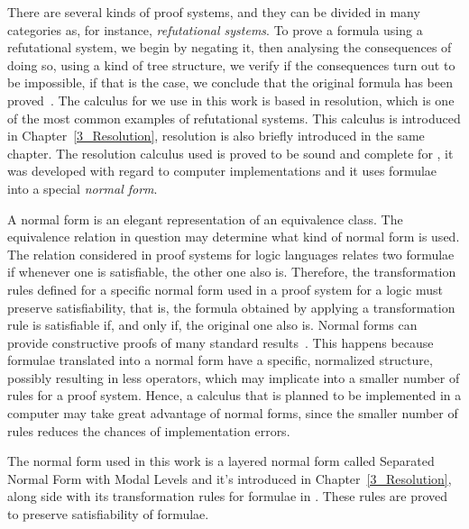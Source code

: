 There are several kinds of proof systems, and they can be divided in many
categories as, for instance, \emph{refutational systems}. To prove a formula
using a refutational system, we begin by negating it, then analysing the
consequences of doing so, using a kind of tree structure, we verify if the
consequences turn out to be impossible, if that is the case, we conclude that
the original formula has been proved~\cite{fitting}. The calculus for
 we use in this work is based in resolution, which is one of
the most common examples of refutational systems. This calculus is introduced
in Chapter~\ref{3_Resolution}, resolution is also briefly introduced in
the same chapter. The resolution calculus used is proved to be sound and
complete for , it was developed with regard to computer
implementations and it uses formulae into a special \emph{normal form}.

A normal form is an elegant representation of an equivalence class. The
equivalence relation in question may determine what kind of normal form is used.
The relation considered in proof systems for logic languages relates two
formulae if whenever one is satisfiable, the other one also is. Therefore, the
transformation rules defined for a specific normal form used in a proof system
for a logic must preserve satisfiability, that is, the formula obtained by
applying a transformation rule is satisfiable if, and only if, the original one
also is. Normal forms can provide constructive proofs of many standard
results~\cite{fine1975}. This happens because formulae translated into a normal
form have a specific, normalized structure, possibly resulting in less
operators, which may implicate into a smaller number of rules for a proof
system. Hence, a calculus that is planned to be implemented in a computer may
take great advantage of normal forms, since the smaller number of rules reduces
the chances of implementation errors. 

The normal form used in this work is a layered normal form called Separated
Normal Form with Modal Levels and it's introduced in Chapter~\ref{3_Resolution},
along side with its transformation rules for formulae in . These
rules are proved to preserve satisfiability of formulae. 
